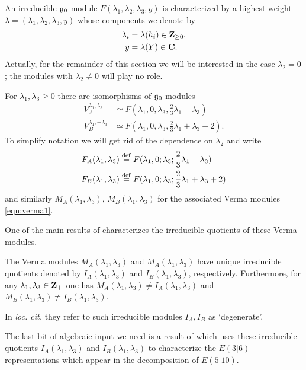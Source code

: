 \documentclass[11pt]{amsart}
\begin{document}
An irreducible $\mathfrak g_0$-module $F(\lambda_1,\lambda_2,\lambda_3,y)$ is characterized by a highest weight $\lambda = (\lambda_1,\lambda_2,\lambda_3,y)$ whose components we denote by
\begin{align*}
\lambda_i & = \lambda (h_i) \in \mathbf{Z}_{\geq 0}, \\
 y & = \lambda(Y)\in \mathbf{C} . 
\end{align*}
Actually, for the remainder of this section we will be interested in the case $\lambda_2 = 0$; the modules with $\lambda_2 \ne 0$ will play no role.
 
For $\lambda_1,\lambda_3 \geq 0$ there are isomorphisms of $\mathfrak g_0$-modules
\begin{align*}
V_A^{\lambda_1,\lambda_3} & \simeq F(\lambda_1,0,\lambda_3,\frac23 \lambda_1 - \lambda_3) \\
V_B^{\lambda_1,-\lambda_3} & \simeq F(\lambda_1,0,\lambda_3,\frac23 \lambda_1 + \lambda_3 +2) .
\end{align*} 
To simplify notation we will get rid of the dependence on $\lambda_2$ and write 
\begin{align*}
F_A(\lambda_1,\lambda_3) & \overset{\rm def}{=} F(\lambda_1,0;\lambda_3;\frac23 \lambda_1 - \lambda_3) \\
F_B(\lambda_1,\lambda_3) & \overset{\rm def}{=} F(\lambda_1,0;\lambda_3;\frac23 \lambda_1 + \lambda_3 +2)  
\end{align*}
and similarly $M_A(\lambda_1,\lambda_3)$, $M_B(\lambda_1,\lambda_3)$ for the associated Verma modules \eqref{eqn:verma1}.

One of the main results of \cite{KR1} characterizes the irreducible quotients of these Verma modules. 
\begin{thm}[\cite{KR1}]
The Verma modules $M_A(\lambda_1,\lambda_3)$ and $M_A(\lambda_1,\lambda_3)$ have unique irreducible quotients denoted by $I_A(\lambda_1,\lambda_3)$ and $I_B(\lambda_1,\lambda_3)$, respectively. 
Furthermore, for any $\lambda_1,\lambda_3 \in \mathbf{Z}_+$ one has $M_A(\lambda_1,\lambda_3) \ne I_A(\lambda_1,\lambda_3)$ and $M_B(\lambda_1,\lambda_3) \ne I_B(\lambda_1,\lambda_3)$.
\end{thm}

In \textit{loc. cit.} they refer to such irreducible modules $I_A,I_B$ as `degenerate'.

\parsec[]

The last bit of algebraic input we need is a result of \cite{KR2} which uses these irreducible quotients $I_A(\lambda_1,\lambda_3)$ and $I_{B} (\lambda_1,\lambda_3)$ to characterize the $E(3|6)$-representations which appear in the decomposition of $E(5|10)$. 
\end{document}
